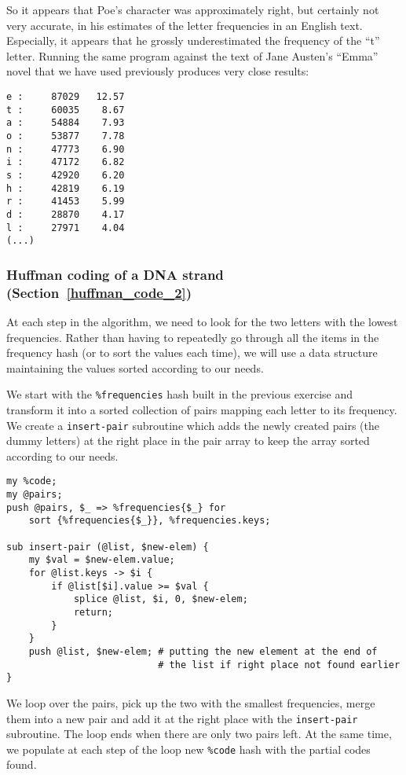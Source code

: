 {So it appears that Poe's character was approximately 
right, but certainly not very accurate, in his estimates of the 
letter frequencies in an English text. Especially, it appears 
that he grossly underestimated the frequency of the ``t'' letter. 
Running the same program against the text of Jane Austen's 
``Emma'' novel that we have used previously produces very 
close results:

\begin{verbatim}
e :     87029   12.57
t :     60035    8.67
a :     54884    7.93
o :     53877    7.78
n :     47773    6.90
i :     47172    6.82
s :     42920    6.20
h :     42819    6.19
r :     41453    5.99
d :     28870    4.17
l :     27971    4.04
(...)
\end{verbatim}

\subsubsection{Huffman coding of a DNA strand (Section~\ref{huffman_code_2})}
\label{sol_huffman_code_2}

At each step in the algorithm, we need to look for 
the two letters with the lowest frequencies. Rather than 
having to repeatedly go through all the items in the 
frequency hash (or to sort the values each time), we 
will use a data structure maintaining the values 
sorted according to our needs.

We start with the \verb'%frequencies' hash built in the 
previous exercise and transform it into a sorted collection 
of pairs mapping each letter to its frequency. We create 
a {\tt insert-pair} subroutine which adds the newly created 
pairs (the dummy letters) at the right place in the pair array 
to keep the array sorted according to our needs.

\begin{verbatim}
my %code;
my @pairs;
push @pairs, $_ => %frequencies{$_} for 
    sort {%frequencies{$_}}, %frequencies.keys;

sub insert-pair (@list, $new-elem) {
    my $val = $new-elem.value;
    for @list.keys -> $i {
        if @list[$i].value >= $val {
            splice @list, $i, 0, $new-elem;
            return;
        }
    }
    push @list, $new-elem; # putting the new element at the end of 
                           # the list if right place not found earlier
}
\end{verbatim}

We loop over the pairs, pick up the two with the smallest 
frequencies, merge them into a new pair and add it at the right 
place with the {\tt insert-pair} subroutine. The loop ends when 
there are only two pairs left. At the same time, we populate at 
each step of the loop new \verb'%code' hash with the partial codes 
found.

}
